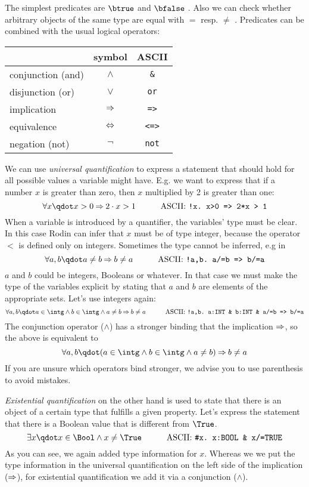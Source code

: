 The simplest predicates are $\btrue$  and $\bfalse$ .
Also we can check whether arbitrary objects of the same type are equal with $=$ resp. $\neq$
\inascii{/=}.
Predicates can be combined with the usual logical operators:
\begin{center}
  \begin{tabular}{lcc}
                      & symbol   & ASCII \\
    \hline
    conjunction (and) & $\land$  & \texttt{\&} \\
    disjunction (or)   & $\lor$   & \texttt{or} \\
    implication       & $\mathbin\Rightarrow$  & \texttt{=>} \\
    equivalence       & $\mathbin\Leftrightarrow$  & \texttt{<=>} \\
    negation (not)    & $\lnot$  & \texttt{not} \\
  \end{tabular}
\end{center}
We can use \emph{universal quantification} to express a statement that should hold for all possible values
a variable might have. E.g. we want to express that if a number $x$ is greater than zero,
then $x$ multiplied by 2 is greater than one:
\[ \forall x \qdot x>0 \limp 2\cdot x > 1 \lascii{!x.\ x>0\ =>\ 2*x\ >\ 1}\]
When a variable is introduced by a quantifier, the variables' type must be clear.
In this case Rodin can infer that $x$ must be of type integer, because the operator $<$ 
is defined only on integers. Sometimes the type cannot be inferred, e.g in
\[ \forall a,b \qdot a\neq b \limp b\neq a \lascii{!a,b.\ a/=b\ =>\ b/=a} \]
$a$ and $b$ could be integers, Booleans or whatever.
In that case we must make the type of the variables explicit by stating that $a$ and $b$ are elements
of the appropriate sets. Let's use integers again:
\[ \forall a,b \qdot a\in\intg \land b\in\intg \land a\neq b \limp b\neq a \lascii{!a,b.\ a:INT \& b:INT \& a/=b => b/=a} \]
The conjunction operator ($\land$) has a stronger binding that the implication $\mathbin\Rightarrow$, so the above is equivalent to
\[ \forall a,b \qdot (a\in\intg \land b\in\intg \land a\neq b) \limp b\neq a\]
If you are unsure which operators bind stronger, we advise you to use parenthesis to avoid mistakes.

\emph{Existential quantification} on the other hand is used to state that there is an object of a certain type that
fulfills a given property. Let's express the statement that there is a Boolean value that is different from
$\True$.
\[ \exists x \qdot x\in\Bool \land x\neq\True \lascii{\#x.\ x:BOOL\ \&\ x/=TRUE} \]
As you can see, we again added type information for $x$. Whereas we we put the type information in the universal
quantification on the left side of the implication ($\mathbin\Rightarrow$), 
for existential quantification we add it via a conjunction ($\land$).

